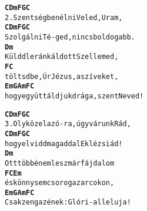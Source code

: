 \begin{minipage}{\textwidth}
\kottastart
{}
\kottaend
\begin{minipage}{\textwidth}
\begin{multicols}{2}
\begin{minipage}{\textwidth}
\begin{alltt}
\textbf{   C            Dm F G       C}
2.  Szentségben élni  Veled, Uram,
\textbf{   C           Dm F  G          C}
    Szolgálni Té-ged, nincs boldogabb.
\textbf{   Dm}
    Küldd le ránk áldott Szellemed,
\textbf{   F               C}
    töltsd be, Úr Jézus, a szíveket,
\textbf{   Em           G        Am     F    C}
    hogy együtt áldjuk drága, szent Neved!
\end{alltt}
\vspace{0.0cm}
\versszakspacing
\end{minipage}
\begin{minipage}{\textwidth}
\begin{alltt}
\textbf{   C             Dm F G            C}
3.  Oly közel az ó-ra, úgy várunk Rád,
\textbf{   C               Dm F G       C}
    hogy elvidd magaddal Eklézsiád!
\textbf{   Dm}
    Ott többé nem lesz már fájdalom
\textbf{   F               C            Em}
    és könny sem csorog az arcokon,
\textbf{   Em            G       Am  F      C}
    Csak zeng az ének: Glóri-alleluja!
\end{alltt}
\vspace{0.0cm}
\versszakspacing
\end{minipage}
\vspace{0.2cm}
\end{multicols}
\end{minipage}

\end{minipage}
~\vspace{1.0cm}
\newline

